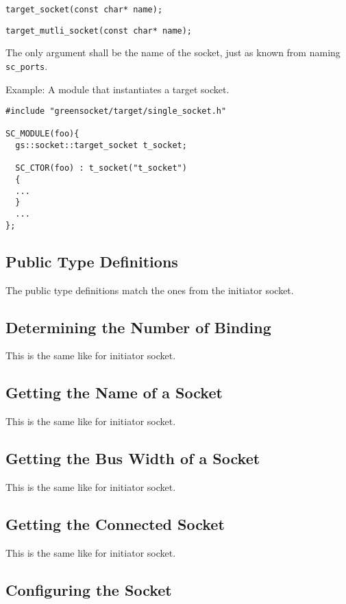 \documentclass[a4paper,10pt]{article}          %
\begin{document}
\verb|target_socket(const char* name);|

\verb|target_mutli_socket(const char* name);|

The only argument shall be the name of the socket, just as known from naming \verb|sc_ports|.

Example: A module that instantiates a target socket.

\begin{small}
\begin{verbatim}
#include "greensocket/target/single_socket.h"

SC_MODULE(foo){
  gs::socket::target_socket t_socket;
  
  SC_CTOR(foo) : t_socket("t_socket")
  {
  ...
  }
  ...
};
\end{verbatim}
\end{small}

\subsection{Public Type Definitions}

The public type definitions match the ones from the initiator socket.

\subsection{Determining the Number of Binding}

This is the same like for initiator socket.

\subsection{Getting the Name of a Socket}

This is the same like for initiator socket.

\subsection{Getting the Bus Width of a Socket}

This is the same like for initiator socket.

\subsection{Getting the Connected Socket}

This is the same like for initiator socket.

\subsection{Configuring the Socket}
\end{document}
